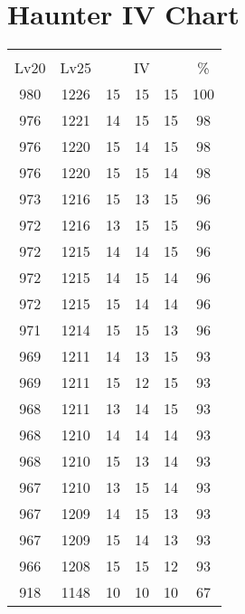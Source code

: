 \documentclass{article}%
\begin{document}
%
\normalsize%
\section{Haunter IV Chart}%
\label{sec:Haunter IV Chart}%
\renewcommand{\arraystretch}{1.5}%
\begin{tabular}{|c|c|c|c|c|c|}%
\hline%
\multicolumn{6}{|c|}{\textcolor{white}{ 
\linebreak{Haunter}
}%
\cellcolor{black}}\\%
\multicolumn{1}{|c}{Lv20}&\multicolumn{1}{c|}{Lv25}&\multicolumn{3}{c|}{IV}&\multicolumn{1}{|c|}{\%}\\%
\hline%
\rowcolor{color100}%
980&1226&15&15&15&100\\%
\hline%
\rowcolor{color98}%
976&1221&14&15&15&98\\%
\hline%
\rowcolor{color98}%
976&1220&15&14&15&98\\%
\hline%
\rowcolor{color98}%
976&1220&15&15&14&98\\%
\hline%
\rowcolor{color96}%
973&1216&15&13&15&96\\%
\hline%
\rowcolor{color96}%
972&1216&13&15&15&96\\%
\hline%
\rowcolor{color96}%
972&1215&14&14&15&96\\%
\hline%
\rowcolor{color96}%
972&1215&14&15&14&96\\%
\hline%
\rowcolor{color96}%
972&1215&15&14&14&96\\%
\hline%
\rowcolor{color96}%
971&1214&15&15&13&96\\%
\hline%
\rowcolor{color93}%
969&1211&14&13&15&93\\%
\hline%
\rowcolor{color93}%
969&1211&15&12&15&93\\%
\hline%
\rowcolor{color93}%
968&1211&13&14&15&93\\%
\hline%
\rowcolor{color93}%
968&1210&14&14&14&93\\%
\hline%
\rowcolor{color93}%
968&1210&15&13&14&93\\%
\hline%
\rowcolor{color93}%
967&1210&13&15&14&93\\%
\hline%
\rowcolor{color93}%
967&1209&14&15&13&93\\%
\hline%
\rowcolor{color93}%
967&1209&15&14&13&93\\%
\hline%
\rowcolor{color93}%
966&1208&15&15&12&93\\%
\hline%
\rowcolor{color91}%
918&1148&10&10&10&67\\%
\end{tabular}

%
\end{document}
